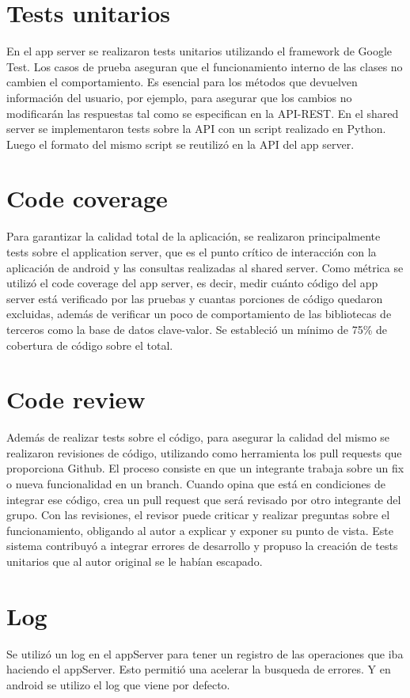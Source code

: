\documentclass[letterpaper,10pt,spanish]{sphinxmanual}
\begin{document}
\noindent{}


\section{Tests unitarios}
\label{manual:tests-unitarios}
En el app server se realizaron tests unitarios utilizando el framework de Google Test. Los casos de prueba aseguran que el funcionamiento interno de las clases no cambien el comportamiento. Es esencial para los métodos que devuelven información del usuario, por ejemplo, para asegurar que los cambios no modificarán las respuestas tal como se especifican en la API-REST.
En el shared server se implementaron tests sobre la API con un script realizado en Python. Luego el formato del mismo script se reutilizó en la API del app server.

\noindent{}


\section{Code coverage}
\label{manual:code-coverage}
Para garantizar la calidad total de la aplicación, se realizaron principalmente tests sobre el application server, que es el punto crítico de interacción con la aplicación de android y las consultas realizadas al shared server. Como métrica se utilizó el code coverage del app server, es decir, medir cuánto código del app server está verificado por las pruebas y cuantas porciones de código quedaron excluidas, además de verificar un poco de comportamiento de las bibliotecas de terceros como la base de datos clave-valor.
Se estableció un mínimo de 75\% de cobertura de código sobre el total.

\noindent{}


\section{Code review}
\label{manual:code-review}
Además de realizar tests sobre el código, para asegurar la calidad del mismo se realizaron revisiones de código, utilizando como herramienta los pull requests que proporciona Github. El proceso consiste en que un integrante trabaja sobre un fix o nueva funcionalidad en un branch. Cuando opina que está en condiciones de integrar ese código, crea un pull request que será revisado por otro integrante del grupo. Con las revisiones, el revisor puede criticar y realizar preguntas sobre el funcionamiento, obligando al autor a explicar y exponer su punto de vista. Este sistema contribuyó a integrar errores de desarrollo y propuso la creación de tests unitarios que al autor original se le habían escapado.


\section{Log}
\label{manual:log}
Se utilizó un log en el appServer para tener un registro de las operaciones que iba haciendo el appServer. Esto permitió una acelerar la busqueda de errores.
Y en android se utilizo el log que viene por defecto.



\renewcommand{\indexname}{Índice}
\printindex
\end{document}
